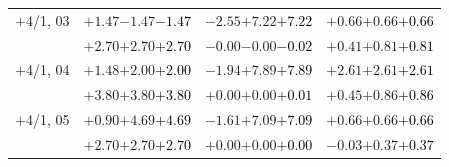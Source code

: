 \documentclass[compress]{beamer}
\begin{document}
\begin{frame}
\begin{tabular}{r | c | c | c}
$+$4/1, 03 & $+1.47$\hspace{0.1 cm}$-1.47$\hspace{0.1 cm}\textcolor{black}{$-1.47$} & $-2.55$\hspace{0.1 cm}$+7.22$\hspace{0.1 cm}\textcolor{black}{$+7.22$} & $+0.66$\hspace{0.1 cm}$+0.66$\hspace{0.1 cm}\textcolor{black}{$+0.66$} \\
           & $+2.70$\hspace{0.1 cm}$+2.70$\hspace{0.1 cm}\textcolor{black}{$+2.70$} & $-0.00$\hspace{0.1 cm}$-0.00$\hspace{0.1 cm}\textcolor{black}{$-0.02$} & $+0.41$\hspace{0.1 cm}$+0.81$\hspace{0.1 cm}\textcolor{black}{$+0.81$} \\
$+$4/1, 04 & $+1.48$\hspace{0.1 cm}$+2.00$\hspace{0.1 cm}\textcolor{black}{$+2.00$} & $-1.94$\hspace{0.1 cm}$+7.89$\hspace{0.1 cm}\textcolor{black}{$+7.89$} & $+2.61$\hspace{0.1 cm}$+2.61$\hspace{0.1 cm}\textcolor{black}{$+2.61$} \\
           & $+3.80$\hspace{0.1 cm}$+3.80$\hspace{0.1 cm}\textcolor{black}{$+3.80$} & $+0.00$\hspace{0.1 cm}$+0.00$\hspace{0.1 cm}\textcolor{black}{$+0.01$} & $+0.45$\hspace{0.1 cm}$+0.86$\hspace{0.1 cm}\textcolor{black}{$+0.86$} \\
$+$4/1, 05 & $+0.90$\hspace{0.1 cm}$+4.69$\hspace{0.1 cm}\textcolor{black}{$+4.69$} & $-1.61$\hspace{0.1 cm}$+7.09$\hspace{0.1 cm}\textcolor{black}{$+7.09$} & $+0.66$\hspace{0.1 cm}$+0.66$\hspace{0.1 cm}\textcolor{black}{$+0.66$} \\
           & $+2.70$\hspace{0.1 cm}$+2.70$\hspace{0.1 cm}\textcolor{black}{$+2.70$} & $+0.00$\hspace{0.1 cm}$+0.00$\hspace{0.1 cm}\textcolor{black}{$+0.00$} & $-0.03$\hspace{0.1 cm}$+0.37$\hspace{0.1 cm}\textcolor{black}{$+0.37$} \\

\end{tabular}
\end{frame}
\end{document}
